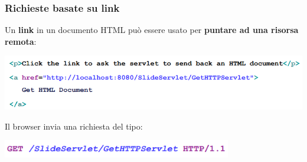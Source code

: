 \documentclass[12pt]{article}
\begin{document}
\subsubsection{Richieste basate su link}
Un \textbf{link} in un documento HTML può essere usato per \textbf{puntare ad una risorsa remota}:
\begin{center}
    \includegraphics[width = 1\textwidth]{Images/178.png}
\end{center}
Il browser invia una richiesta del tipo:
\begin{center}
    \includegraphics[width = 0.75\textwidth]{Images/179.png}
\end{center}
\newpage
\end{document}
